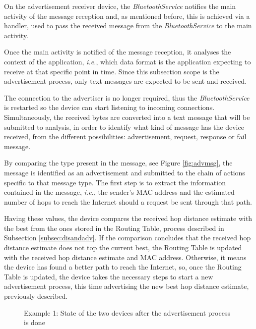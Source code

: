 On the advertisement receiver device, the \textit{BluetoothService} notifies the main activity of the message reception and, as mentioned before, this is achieved via a handler, used to pass the received message from the \textit{BluetoothService} to the main activity.

Once the main activity is notified of the message reception, it analyses the context of the application, \textit{i.e.}, which data format is the application expecting to receive at that specific point in time. Since this subsection scope is the advertisement process, only text messages are expected to be sent and received.

The connection to the advertiser is no longer required, thus the \textit{BluetoothService} is restarted so the device can start listening to incoming connections. Simultaneously, the received bytes are converted into a text message that will be submitted to analysis, in order to identify what kind of message has the device received, from the different possibilities: advertisement, request, response or fail message.

By comparing the type present in the message, see Figure \ref{fig:advmsg}, the message is identified as an advertisement and submitted to the chain of actions specific to that message type. The first step is to extract the information contained in the message, \textit{i.e.}, the sender's \gls{MAC} address and the estimated number of hops to reach the Internet should a request be sent through that path.

Having these values, the device compares the received hop distance estimate with the best from the ones stored in the Routing Table, process described in Subsection \ref{subsec:disandadv}. If the comparison concludes that the received hop distance estimate does not top the current best, the Routing Table is updated with the received hop distance estimate and \gls{MAC} address. Otherwise, it means the device has found a better path to reach the Internet, so, once the Routing Table is updated, the device takes the necessary steps to start a new advertisement process, this time advertising the new best hop distance estimate, previously described. 

\begin{figure}[ht]
   \noindent{}
	\caption{\label{fig:adveg2} Example 1: State of the two devices after the advertisement process is done} 
\end{figure}

